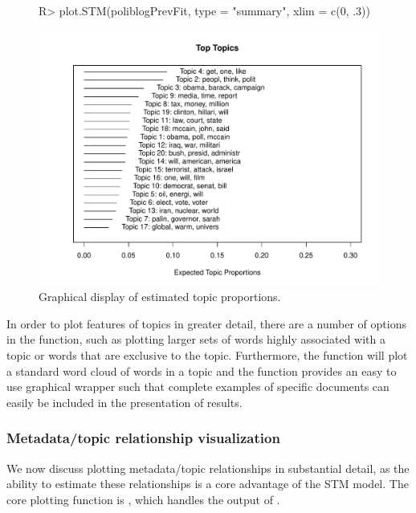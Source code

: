\documentclass[article,shortnames]{jss}
\begin{document}
\begin{figure}
\begin{center}
\begin{Schunk}
\begin{Sinput}
R> plot.STM(poliblogPrevFit, type = "summary", xlim = c(0, .3))
\end{Sinput}
\end{Schunk}
\includegraphics{stmVignette-016}
\caption{Graphical display of estimated topic proportions.}
\label{fig:summary}
\end{center}
\end{figure}


In order to plot features of topics in greater detail, there are a number of options in the  function, such as plotting larger sets of words highly associated with a topic or words that are exclusive to the topic. Furthermore, the  function will plot a standard word cloud of words in a topic and the  function provides an easy to use graphical wrapper such that complete examples of specific documents can easily be included in the presentation of results.

\subsubsection{Metadata/topic relationship visualization}

We now discuss plotting metadata/topic relationships in substantial detail, as the ability to estimate these relationships is a core advantage of the STM model. The core plotting function is , which handles the output of .
\end{document}
